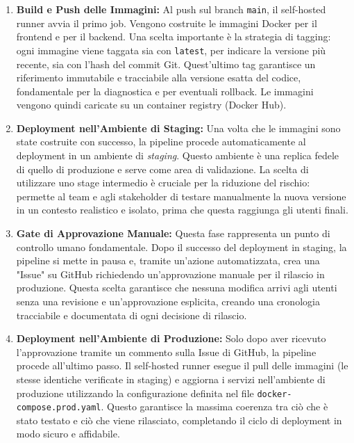 \documentclass[12pt,a4paper,openright,twoside]{book}
\begin{document}
\begin{enumerate}
    \item \textbf{Build e Push delle Immagini:} Al push sul branch \texttt{main}, il self-hosted runner avvia il primo job. Vengono costruite le immagini Docker per il frontend e per il backend. Una scelta importante è la strategia di tagging: ogni immagine viene taggata sia con \texttt{latest}, per indicare la versione più recente, sia con l'hash del commit Git. Quest'ultimo tag garantisce un riferimento immutabile e tracciabile alla versione esatta del codice, fondamentale per la diagnostica e per eventuali rollback. Le immagini vengono quindi caricate su un container registry (Docker Hub).

    \item \textbf{Deployment nell'Ambiente di Staging:} Una volta che le immagini sono state costruite con successo, la pipeline procede automaticamente al deployment in un ambiente di \textit{staging}. Questo ambiente è una replica fedele di quello di produzione e serve come area di validazione. La scelta di utilizzare uno stage intermedio è cruciale per la riduzione del rischio: permette al team e agli stakeholder di testare manualmente la nuova versione in un contesto realistico e isolato, prima che questa raggiunga gli utenti finali.

    \item \textbf{Gate di Approvazione Manuale:} Questa fase rappresenta un punto di controllo umano fondamentale. Dopo il successo del deployment in staging, la pipeline si mette in pausa e, tramite un'azione automatizzata, crea una "Issue" su GitHub richiedendo un'approvazione manuale per il rilascio in produzione. Questa scelta garantisce che nessuna modifica arrivi agli utenti senza una revisione e un'approvazione esplicita, creando una cronologia tracciabile e documentata di ogni decisione di rilascio.

    \item \textbf{Deployment nell'Ambiente di Produzione:} Solo dopo aver ricevuto l'approvazione tramite un commento sulla Issue di GitHub, la pipeline procede all'ultimo passo. Il self-hosted runner esegue il pull delle immagini (le stesse identiche verificate in staging) e aggiorna i servizi nell'ambiente di produzione utilizzando la configurazione definita nel file \texttt{docker-compose.prod.yaml}. Questo garantisce la massima coerenza tra ciò che è stato testato e ciò che viene rilasciato, completando il ciclo di deployment in modo sicuro e affidabile.
\end{enumerate}
\end{document}
